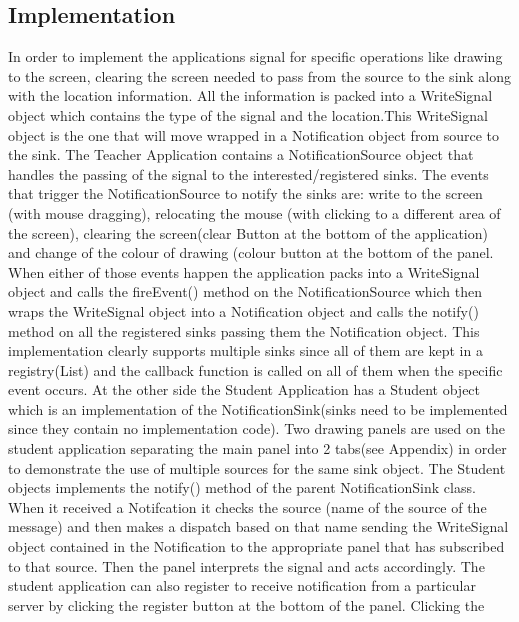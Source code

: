 \documentclass[a4paper,12pt,titlepage]{article}
\begin{document}
\subsection{Implementation}
In order to implement the applications signal for specific operations like drawing to the screen, clearing the screen needed to pass from the source to the sink along with the location information. All the information is packed into a WriteSignal object which contains the type of the signal and the location.This WriteSignal object is the one that will move wrapped in a Notification object from source to the sink. The Teacher Application contains a NotificationSource object that handles the passing of the signal to the interested/registered sinks. The events that trigger the NotificationSource to notify the sinks are: write to the screen (with mouse dragging), relocating the mouse (with clicking to a different area of the screen), clearing the screen(clear Button at the bottom of the application) and change of the colour of drawing (colour button at the bottom of the panel. When either of those events happen the application packs into a WriteSignal object and calls the fireEvent() method on the NotificationSource which then wraps the WriteSignal object into a Notification object and calls the notify() method on all the registered sinks passing them the Notification object. This implementation clearly supports multiple sinks since all of them are kept in a registry(List) and the callback function is called on all of them when the specific event occurs. At the other side the Student Application has a Student object which is an implementation of the NotificationSink(sinks need to be implemented since they contain no implementation code). Two drawing panels are used on the student application separating the main panel into 2 tabs(see Appendix) in order to demonstrate the use of multiple sources for the same sink object. The Student objects implements the notify() method of the parent NotificationSink class. When it received a Notifcation it checks the source (name of the source of the message) and then makes a dispatch based on that name sending the WriteSignal object contained in the Notification to the appropriate panel that has subscribed to that source. Then the panel interprets the signal and acts accordingly. The student application can also register to receive notification from a particular server by clicking the register button at the bottom of the panel. Clicking the 
\end{document}
